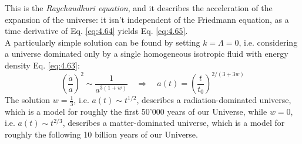 This is the \textit{Raychaudhuri equation}, and it describes the acceleration of the expansion of the universe: it isn't independent of the Friedmann equation, as a time derivative of Eq. \ref{eq:4.64} yields Eq. \ref{eq:4.65}.\\
A particularly simple solution can be found by setting $ k = \Lambda = 0 $, i.e. considering a universe dominated only by a single homogeneous isotropic fluid with energy density Eq. \ref{eq:4.63}:
\begin{equation*}
  \left( \frac{\dot{a}}{a} \right)^2 \sim \frac{1}{a^{3(1 + w)}}
  \quad \Rightarrow \quad
  a(t) = \left( \frac{t}{t_0} \right)^{2 / (3 + 3w)}
\end{equation*}
The solution $ w = \frac{1}{3} $, i.e. $ a(t) \sim t^{1/2} $, describes a radiation-dominated universe, which is a model for roughly the first 50'000 years of our Universe, while $ w = 0 $, i.e. $ a(t) \sim t^{2/3} $, describes a matter-dominated universe, which is a model for roughly the following 10 billion years of our Universe.










